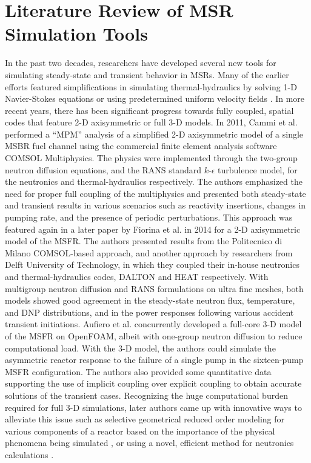 \section{Literature Review of MSR Simulation Tools}

In the past two decades, researchers have developed several
new tools for simulating steady-state and transient behavior in \glspl{MSR}.
Many of the earlier efforts featured simplifications in simulating
thermal-hydraulics by solving 1-D Navier-Stokes equations or using
predetermined uniform velocity fields \cite{krepel_dyn3d-msr_2007,
kophazi_development_2009}. In more recent years, there has been
significant progress towards fully coupled, spatial codes that feature
2-D axisymmetric or full 3-D models. In 2011, Cammi et al.
\cite{cammi_multi-physics_2011} performed a ``\gls{MPM}'' analysis
of a simplified 2-D axisymmetric model of a single \gls{MSBR} fuel channel
using the commercial finite element analysis software COMSOL Multiphysics. The
physics were implemented through the two-group neutron diffusion equations,
and the \gls{RANS} standard $k$-$\epsilon$ turbulence model, for the
neutronics and thermal-hydraulics respectively. The
authors emphasized the need for proper full coupling of the multiphysics and
presented both steady-state and transient results in various
scenarios such as reactivity insertions, changes in pumping rate, and the
presence of periodic perturbations. This approach was featured again in a
later paper by Fiorina et al. \cite{fiorina_modelling_2014} in 2014 for a 2-D
axisymmetric model of the
\gls{MSFR}. The authors presented results from the Politecnico di Milano
COMSOL-based approach, and another approach by researchers from Delft
University of Technology, in which they coupled their in-house neutronics and
thermal-hydraulics codes, DALTON and HEAT respectively. With multigroup
neutron diffusion and \gls{RANS} formulations on ultra fine meshes, both
models showed good agreement in the steady-state neutron flux, temperature,
and \gls{DNP} distributions, and in the power responses following various
accident transient initiations. Aufiero et al. \cite{aufiero_development_2014}
concurrently developed
a full-core 3-D model of the \gls{MSFR} on OpenFOAM, albeit with one-group
neutron diffusion to reduce computational load. With the 3-D model, the
authors could simulate the asymmetric reactor response to the failure of a
single pump in the sixteen-pump \gls{MSFR} configuration. The authors also
provided some quantitative data supporting the use of implicit coupling over
explicit coupling to obtain accurate solutions of the transient cases.
Recognizing the huge computational burden required for full 3-D simulations, 
later authors came up with innovative ways to alleviate this issue such as
selective geometrical reduced order modeling for various components of a
reactor based on the importance of the physical phenomena being simulated
\cite{zanetti_geometric_2015}, or using a novel, efficient method for
neutronics calculations \cite{laureau_transient_2017}.

